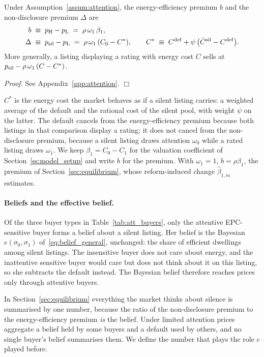 \begin{lemma}
\label{lem:att_prices}
Under Assumption~\ref{assum:attention}, the energy-efficiency premium $b$ and the non-disclosure premium $\Delta$ are
\begin{align}
    b&\;\equiv\;p_{\rm H}-p_{\rm L}\;=\;\rho\,\omega_1\,\beta_1, \label{eq:b_att}\\
    \Delta&\;\equiv\;p_{\rm sil}-p_{\rm L}\;=\;\rho\,\omega_1\,(C_0-C^*),\qquad C^*\;\equiv\;C^{\rm def}+\psi\,\big(\bar C^{\rm sil}-C^{\rm def}\big). \label{eq:premium_att}
\end{align}
More generally, a listing displaying a rating with energy cost $C$ sells at $p_{\rm sil}-\rho\,\omega_1\,(C-C^*)$.
\end{lemma}

\noindent\textit{Proof.} See Appendix~\ref{app:attention}. $\Box$

$C^*$ is the energy cost the market behaves as if a silent listing carries: a weighted average of the default and the rational cost of the silent pool, with weight $\psi$ on the latter. The default cancels from the energy-efficiency premium because both listings in that comparison display a rating; it does not cancel from the non-disclosure premium, because a silent listing draws attention $\omega_0$ while a rated listing draws $\omega_1$. We keep $\beta_1=C_0-C_1$ for the valuation coefficient of Section~\ref{ss:model_setup} and write $b$ for the premium. With $\omega_1=1$, $b=\rho\beta_1$, the premium of Section~\ref{sec:equilibrium}, whose reform-induced change $\hat\beta_{1,m}$ estimates.

\paragraph{Beliefs and the effective belief.}
Of the three buyer types in Table~\ref{tab:att_buyers}, only the attentive EPC-sensitive buyer forms a belief about a silent listing. Her belief is the Bayesian $e(\sigma_0,\sigma_1)$ of~\eqref{eq:belief_general}, unchanged: the share of efficient dwellings among silent listings. The insensitive buyer does not care about energy, and the inattentive sensitive buyer would care but does not think about it on this listing, so she subtracts the default instead. The Bayesian belief therefore reaches prices only through attentive buyers.

In Section~\ref{sec:equilibrium} everything the market thinks about silence is summarised by one number, because the ratio of the non-disclosure premium to the energy-efficiency premium \emph{is} the belief. Under limited attention prices aggregate a belief held by some buyers and a default used by others, and no single buyer's belief summarises them. We define the number that plays the role $e$ played before.

